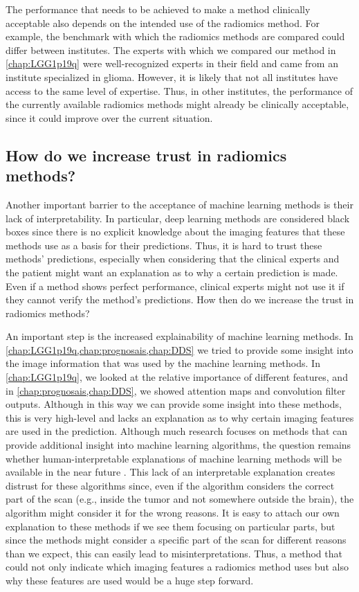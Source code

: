 The performance that needs to be achieved to make a method clinically acceptable also depends on the intended use of the radiomics method.
For example, the benchmark with which the radiomics methods are compared could differ between institutes.
The experts with which we compared our method in \cref{chap:LGG1p19q} were well-recognized experts in their field and came from an institute specialized in glioma.
However, it is likely that not all institutes have access to the same level of expertise.
Thus, in other institutes, the performance of the currently available radiomics methods might already be clinically acceptable, since it could improve over the current situation.

\subsection{How do we increase trust in radiomics methods?}

Another important barrier to the acceptance of machine learning methods is their lack of interpretability.
In particular, deep learning methods are considered black boxes since there is no explicit knowledge about the imaging features that these methods use as a basis for their predictions.
Thus, it is hard to trust these methods' predictions, especially when considering that the clinical experts and the patient might want an explanation as to why a certain prediction is made.
Even if a method shows perfect performance, clinical experts might not use it if they cannot verify the method's predictions.
How then do we increase the trust in radiomics methods?

An important step is the increased explainability of machine learning methods.
In \cref{chap:LGG1p19q,chap:prognosais,chap:DDS} we  tried to provide some insight into the image information that was used by the machine learning methods.
In \cref{chap:LGG1p19q}, we looked at the relative importance of different features, and in \cref{chap:prognosais,chap:DDS}, we showed attention maps and convolution filter outputs.
Although in this way we can provide some insight into these methods, this is very high-level and lacks an explanation as to why certain imaging features are used in the prediction.
Although much research focuses on methods that can provide additional insight into machine learning algorithms, the question remains whether human-interpretable explanations of machine learning methods will be available in the near future \autocite{zhang2018interpretable}.
This lack of an interpretable explanation creates distrust for these algorithms since, even if the algorithm considers the correct part of the scan (e.g., inside the \gls{tumor} and not somewhere outside the brain), the algorithm might consider it for the wrong reasons.
It is easy to attach our own explanation to these methods if we see them focusing on particular parts, but since the methods might consider a specific part of the scan for different reasons than we expect, this can easily lead to misinterpretations.
Thus, a method that could not only indicate which imaging features a radiomics method uses but also why these features are used would be a huge step forward.

